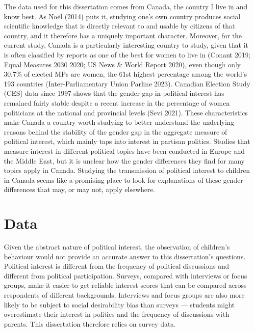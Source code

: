 \documentclass[
  letterpaper,
  DIV=11,
  numbers=noendperiod]{scrreprt}
\begin{document}
The data used for this dissertation comes from Canada, the country I
live in and know best. As Noël (2014) puts it, studying one's own
country produces social scientific knowledge that is directly relevant
to and usable by citizens of that country, and it therefore has a
uniquely important character. Moreover, for the current study, Canada is
a particularly interesting country to study, given that it is often
classified by reports as one of the best for women to live in (Conant
2019; Equal Measures 2030 2020; US News \& World Report 2020), even
though only 30.7\% of elected MPs are women, the 61st highest percentage
among the world's 193 countries (Inter-Parliamentary Union Parline
2023). Canadian Election Study (CES) data since 1997 shows that the
gender gap in political interest has remained fairly stable despite a
recent increase in the percentage of women politicians at the national
and provincial levels (Sevi 2021). These characteristics make Canada a
country worth studying to better understand the underlying reasons
behind the stability of the gender gap in the aggregate measure of
political interest, which mainly taps into interest in partisan
politics. Studies that measure interest in different political topics
have been conducted in Europe and the Middle East, but it is unclear how
the gender differences they find for many topics apply in Canada.
Studying the transmission of political interest to children in Canada
seems like a promising place to look for explanations of these gender
differences that may, or may not, apply elsewhere.

\section{Data}\label{data}

Given the abstract nature of political interest, the observation of
children's behaviour would not provide an accurate answer to this
dissertation's questions. Political interest is different from the
frequency of political discussions and different from political
participation. Surveys, compared with interviews or focus groups, make
it easier to get reliable interest scores that can be compared across
respondents of different backgrounds. Interviews and focus groups are
also more likely to be subject to social desirability bias than surveys
--- students might overestimate their interest in politics and the
frequency of discussions with parents. This dissertation therefore
relies on survey data.
\end{document}
